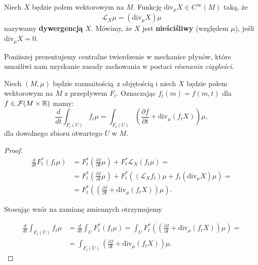 Niech \(X\) będzie polem wektorowym na \(M\). Funkcję \(\mathrm{div}_\mu X \in C^\infty(M)\) taką, że 
\begin{equation}
\mathcal{L}_X \mu = (\mathrm{div}_\mu X) \mu
\end{equation}
nazywamy \textbf{dywergencją} \(X\). Mówimy, że \(X\) jest \textbf{nieściśliwy} (względem \(\mu\)), jeśli \(\mathrm{div}_\mu X = 0\).

Poniższej prezentujemy centralne twierdzenie w mechanice płynów, które umożliwi nam uzyskanie zasady zachowania w postaci \emph{równania ciągłości}.
\begin{twierdzenie}\label{thm:transport}
    Niech \((M, \mu)\) będzie rozmaitością z objętością i niech \(X\) będzie polem wektorowym na \(M\) z przepływem \(F_t\). Oznaczając \(f_t(m) = f(m, t)\) dla \(f\in\mathcal{F}(M\times \mathbb{R})\) mamy:
\begin{equation}\label{eq:transport}
    \frac{d}{dt}\int_{F_t(U)} f_t \mu = \int_{F_t(U)}\left(\frac{\partial f}{\partial t} + \mathrm{div}_\mu (f_t X)\right) \mu,
\end{equation}
    dla dowolnego zbioru otwartego \(U\) w \(M\).
\end{twierdzenie}
\begin{proof}
    \begin{align*}
        \frac{d}{dt}F^\ast_t(f_t\mu) &= F^\ast_t\left(\frac{\partial f}{\partial t}\mu\right)+
        F^\ast_t\mathcal{L}_X(f_t\mu) =\\
        &= F^\ast_t\left(\frac{\partial f}{\partial t}\mu\right) +
        F^\ast_t\left(\left(\mathcal{L}_X f_t\right)\mu + f_t(\mathrm{div}_\mu X)\mu\right) =\\
        &= F^\ast_t\left(\left(\frac{\partial f}{\partial t}+\mathrm{div}_\mu(f_t X)\right)\mu\right). 
    \end{align*}

    Stosując wzór na zamianę zmiennych otrzymujemy

    \begin{align*}
       \frac{d}{dt}\int_{F_t (U)} f_t \mu &= \frac{d}{dt}\int_U F^\ast_t (f_t \mu) 
       = \int_U F^\ast_t \left(\left(\frac{\partial f}{\partial t} + \mathrm{div}_\mu (f_t X)\right)\mu\right) =\\
       &=\int_{F_t(U)} \left(\frac{\partial f}{\partial t} + \mathrm{div}_\mu (f_t X)\right)\mu.
    \end{align*}
\end{proof}
